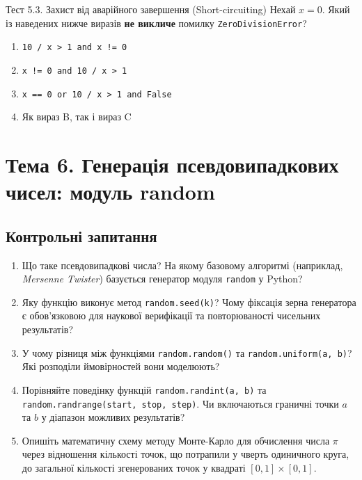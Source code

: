 \begin{pr}{Тест 5.3. Захист від аварійного завершення (Short-circuiting)}
Нехай $x = 0$. Який із наведених нижче виразів \textbf{не викличе} помилку \texttt{ZeroDivisionError}?
\begin{enumerate}[label=\textbf{\Alph*.}]
	\item \texttt{10 / x > 1 and x != 0}
	\item \texttt{x != 0 and 10 / x > 1}
	\item \texttt{x == 0 or 10 / x > 1 and False}
	\item Як вираз B, так і вираз C
\end{enumerate}
\end{pr}

\section{Тема 6. Генерація псевдовипадкових чисел: модуль random}

\subsection*{Контрольні запитання}
\begin{enumerate}[label=\textbf{6.\arabic*.}]
	\item Що таке псевдовипадкові числа? На якому базовому алгоритмі (наприклад, \textit{Mersenne Twister}) базується генератор модуля \texttt{random} у Python?
	\item Яку функцію виконує метод \texttt{random.seed(k)}? Чому фіксація зерна генератора є обов'язковою для наукової верифікації та повторюваності чисельних результатів?
	\item У чому різниця між функціями \texttt{random.random()} та \texttt{random.uniform(a, b)}? Які розподіли ймовірностей вони моделюють?
	\item Порівняйте поведінку функцій \texttt{random.randint(a, b)} та \texttt{random.randrange(start, stop, step)}. Чи включаються граничні точки $a$ та $b$ у діапазон можливих результатів?
	\item Опишіть математичну схему методу Монте-Карло для обчислення числа $\pi$ через відношення кількості точок, що потрапили у чверть одиничного круга, до загальної кількості згенерованих точок у квадраті $[0, 1] \times [0, 1]$.
\end{enumerate}

